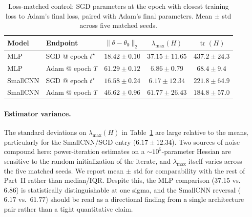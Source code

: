 \documentclass[11pt]{article}
\begin{document}
\begin{table}[H]
\centering
\small
\setlength{\tabcolsep}{4pt}
\begin{tabular}{llccc}
\toprule
\textbf{Model} & \textbf{Endpoint} & $\|\theta-\theta_0\|_2$ & $\lambda_{\max}(H)$ & $\operatorname{tr}(H)$ \\
\midrule
MLP      & SGD @ epoch $t^\star$ & $18.42 \pm 0.10$ & $37.15 \pm 11.65$ & $437.2 \pm 24.3$ \\
MLP      & Adam @ epoch $T$      & $61.29 \pm 0.12$ & $6.86 \pm 0.79$   & $68.4 \pm 9.4$  \\
\addlinespace
SmallCNN & SGD @ epoch $t^\star$ & $16.58 \pm 0.24$ & $6.17 \pm 12.34$  & $221.8 \pm 64.9$ \\
SmallCNN & Adam @ epoch $T$      & $46.62 \pm 0.96$ & $61.77 \pm 26.43$ & $184.8 \pm 57.0$ \\
\bottomrule
\end{tabular}
\caption{Loss-matched control: SGD parameters at the epoch with closest training loss to Adam's final loss, paired with Adam's final parameters. Mean $\pm$ std across five matched seeds.}
\label{tab:loss-matched}
\end{table}

\paragraph{Estimator variance.}
The standard deviations on $\lambda_{\max}(H)$ in Table~\ref{tab:loss-matched} are large relative to the means, particularly for the SmallCNN/SGD entry ($6.17 \pm 12.34$). Two sources of noise compound here: power-iteration estimates on a $\sim 10^5$-parameter Hessian are sensitive to the random initialization of the iterate, and $\lambda_{\max}$ itself varies across the five matched seeds. We report mean $\pm$ std for comparability with the rest of Part~II rather than median/IQR. Despite this, the MLP comparison ($37.15$ vs.\ $6.86$) is statistically distinguishable at one sigma, and the SmallCNN reversal ($6.17$ vs.\ $61.77$) should be read as a directional finding from a single architecture pair rather than a tight quantitative claim.
\end{document}
